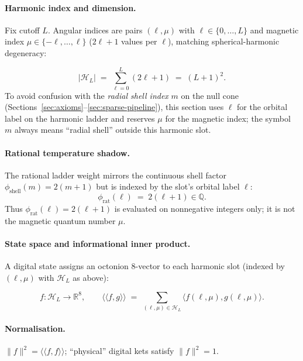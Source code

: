 \documentclass[11pt,a4paper]{article}
\theoremstyle{remark}
\begin{document}
\paragraph{Harmonic index and dimension.}
Fix cutoff $L$. Angular indices are pairs $(\ell,\mu)$ with $\ell\in\{0,\ldots,L\}$ and magnetic index $\mu\in\{-\ell,\ldots,\ell\}$ ($2\ell+1$ values per $\ell$), matching spherical-harmonic degeneracy:

\begin{equation}
  |\mathcal{H}_L| \;=\; \sum_{\ell=0}^{L} (2\ell+1) \;=\; (L+1)^2.
\end{equation}
To avoid confusion with the \emph{radial shell index} $m$ on the null cone (Sections~\ref{sec:axioms}--\ref{sec:sparse-pipeline}), this section uses $\ell$ for the orbital label on the harmonic ladder and reserves $\mu$ for the magnetic index; the symbol $m$ always means ``radial shell'' outside this harmonic slot.

\paragraph{Rational temperature shadow.}
The rational ladder weight mirrors the continuous shell factor $\phi_{\mathrm{shell}}(m)=2(m+1)$ but is indexed by the slot's orbital label $\ell$:
\begin{equation}
  \phi_{\mathrm{rat}}(\ell) \;=\; 2(\ell+1)\in\mathbb{Q}.
\end{equation}
Thus $\phi_{\mathrm{rat}}(\ell)=2(\ell+1)$ is evaluated on nonnegative integers only; it is not the magnetic quantum number $\mu$.

\paragraph{State space and informational inner product.}
A digital state assigns an octonion $8$-vector to each harmonic slot (indexed by $(\ell,\mu)$ with $\mathcal{H}_L$ as above):

\begin{equation}
  f:\mathcal{H}_L \to \mathbb{R}^8,
  \qquad
  \langle\!\langle f,g\rangle\!\rangle \;=\; \sum_{(\ell,\mu)\in\mathcal{H}_L} \langle f(\ell,\mu),g(\ell,\mu)\rangle.
\end{equation}

\paragraph{Normalisation.}
$\|f\|^2=\langle\!\langle f,f\rangle\!\rangle$; ``physical'' digital kets satisfy $\|f\|^2=1$.
\end{document}
